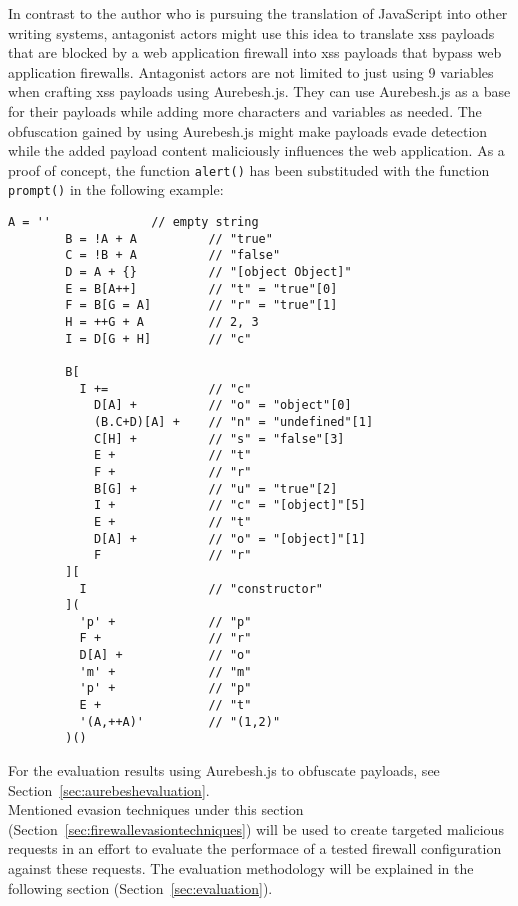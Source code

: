 In contrast to the author who is pursuing the translation of JavaScript into other writing systems, antagonist actors might use this idea to translate \acrshort{xss} payloads that are blocked by a web application firewall into \acrshort{xss} payloads that bypass web application firewalls. Antagonist actors are not limited to just using 9 variables when crafting \acrshort{xss} payloads using Aurebesh.js. They can use Aurebesh.js as a base for their payloads while adding more characters and variables as needed.
The obfuscation gained by using Aurebesh.js might make payloads evade detection while the added payload content maliciously influences the web application.
As a proof of concept, the function \verb|alert()| has been substituded with the function \verb|prompt()| in the following example:

\begin{lstlisting}[style=basicStyle, caption=Aurebesh.js obfuscation of prompt, label={lst:aurebeshprompt}]
		A = ''              // empty string
		B = !A + A          // "true"
		C = !B + A          // "false"
		D = A + {}          // "[object Object]"
		E = B[A++]          // "t" = "true"[0]
		F = B[G = A]        // "r" = "true"[1]
		H = ++G + A         // 2, 3
		I = D[G + H]        // "c"

		B[
		  I +=              // "c"
		    D[A] +          // "o" = "object"[0]
		    (B.C+D)[A] +    // "n" = "undefined"[1]
		    C[H] +          // "s" = "false"[3]
		    E +             // "t"
		    F +             // "r"
		    B[G] +          // "u" = "true"[2]
		    I +             // "c" = "[object]"[5]
		    E +             // "t"
		    D[A] +          // "o" = "[object]"[1]
		    F               // "r"
		][
		  I                 // "constructor"
		](
		  'p' +             // "p"
		  F +               // "r"
		  D[A] +            // "o"
		  'm' +             // "m"
		  'p' +             // "p"
		  E +               // "t"
		  '(A,++A)'         // "(1,2)"
		)()
\end{lstlisting}

For the evaluation results using Aurebesh.js to obfuscate payloads, see Section~\ref{sec:aurebeshevaluation}. \\

Mentioned evasion techniques under this section (Section~\ref{sec:firewallevasiontechniques}) will be used to create targeted malicious requests in an effort to evaluate the performace of a tested firewall configuration against these requests. The evaluation methodology will be explained in the following section (Section~\ref{sec:evaluation}).
